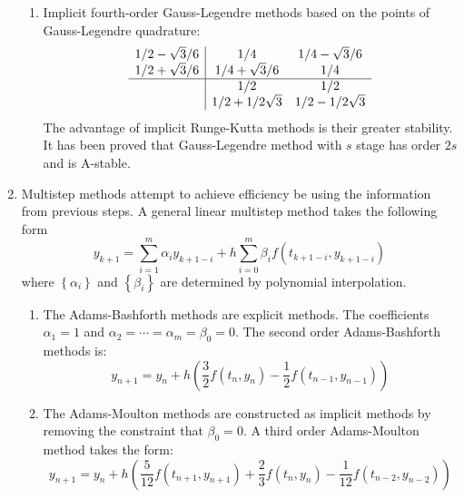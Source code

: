 \begin{enumerate}
\begin{enumerate}
\item Implicit fourth-order Gauss-Legendre methods based on the points of Gauss-Legendre quadrature:
\begin{equation}
\begin{array}{c|cccc}
1/2-\sqrt{3}/6   & 1/4   & 1/4-\sqrt{3}/6 \\
1/2+\sqrt{3}/6   & 1/4+\sqrt{3}/6    & 1/4 \\
\hline
& 1/2 & 1/2\\
& 1/2 + 1/2\sqrt{3} & 1/2-1/2\sqrt{3}
\end{array}
\end{equation}
The advantage of implicit Runge-Kutta methods is their greater stability. It has been proved that Gauss-Legendre method with $s$ stage has order $2s$ and is A-stable.
\end{enumerate}

\item Multistep methods attempt to achieve efficiency be using the information from previous steps. A general linear multistep method takes the following form
\begin{equation}
y_{k+1}=\sum_{i=1}^{m}\alpha_{i}y_{k+1-i}+h\sum_{i=0}^{m}\beta_{i}f\left(t_{k+1-i},y_{k+1-i}\right)
\end{equation}
where $\left\{ \alpha_{i}\right\} $ and $\left\{ \beta_{i}\right\} $ are determined by polynomial interpolation.
\begin{enumerate}
\item The Adams-Bashforth methods are explicit methods. The coefficients $\alpha_1 = 1$ and $\alpha_{2} = \cdots = \alpha_{m} = \beta_0 = 0$. The second order Adams-Bashforth methods is:
\begin{equation}
y_{n+1} = y_{n} + h(\frac{3}{2}f(t_{n}, y_{n}) - \frac{1}{2}f(t_{n-1}, y_{n-1}))
\end{equation} 

\item The Adams-Moulton methods are constructed as implicit methods by removing the constraint that $\beta_0 = 0$. A third order Adams-Moulton method takes the form:
\begin{equation}
y_{n+1} = y_{n} + h(\frac{5}{12}f(t_{n+1}, y_{n+1}) + \frac{2}{3}f(t_n, y_n) - \frac{1}{12}f(t_{n-2}, y_{n-2}))
\end{equation}


\end{enumerate}
\end{enumerate}
